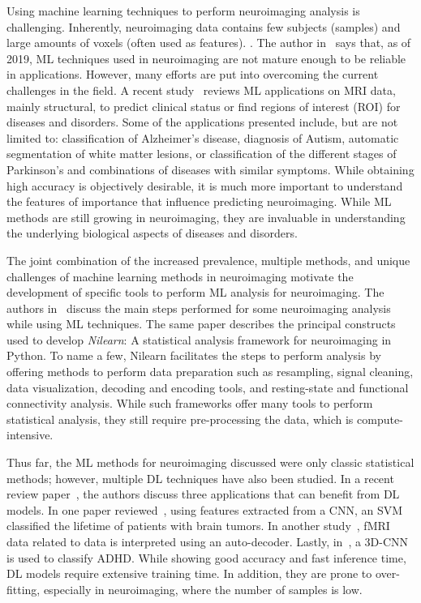 Using machine learning techniques to perform neuroimaging analysis is challenging.
Inherently, neuroimaging data contains few subjects (samples) and large amounts
of voxels (often used as features).
.
The author in~\cite{Davatzikos2019-dc} says that, as of 2019, ML techniques used in
neuroimaging are not mature enough to be reliable in applications.
However, many efforts are put into overcoming the current challenges in the field.
A recent study~\cite{Mateos-Perez2018-wx} reviews ML applications on MRI data,
mainly structural, to predict clinical status or find regions of interest (ROI) for diseases and disorders.
Some of the applications presented include, but are not limited to:
classification of Alzheimer's disease, diagnosis of Autism, automatic segmentation
of white matter lesions, or classification of the different stages of Parkinson's
and combinations of diseases with similar symptoms.
While obtaining high accuracy is objectively desirable, it is much more important
to understand the features of importance that influence predicting neuroimaging.
While ML methods are still growing in neuroimaging, they are invaluable in
understanding the underlying biological aspects of diseases and disorders. 
	
The joint combination of the increased prevalence, multiple methods, and unique
challenges of machine learning methods in neuroimaging motivate the development
of specific tools to perform ML analysis for neuroimaging.
The authors in~\cite{Abraham2014-zv} discuss the main steps performed for some
neuroimaging analysis while using ML techniques.
The same paper describes the principal constructs used to develop \textit{Nilearn}:
A statistical analysis framework for neuroimaging in Python.
To name a few, Nilearn facilitates the steps to perform analysis by offering methods
to perform data preparation such as resampling, signal cleaning, data visualization,
decoding and encoding tools, and resting-state and functional connectivity analysis.
While such frameworks offer many tools to perform statistical analysis, they still
require pre-processing the data, which is compute-intensive.
	
Thus far, the ML methods for neuroimaging discussed were only classic
statistical methods; however, multiple DL techniques have also been studied.
In a recent review paper~\cite{Wen2018-to}, the authors discuss three applications
that can benefit from DL models.
In one paper reviewed~\cite{Nie2016-sw}, using features extracted from a CNN,
an SVM classified the lifetime of patients with brain tumors.
In another study~\cite{Wen2018-xm}, fMRI data related to data is interpreted using an auto-decoder.
Lastly, in~\cite{Zou2017-hd}, a 3D-CNN is used to classify ADHD.
While showing good accuracy and fast inference time, DL models require extensive training time.
In addition, they are prone to over-fitting, especially in neuroimaging, where the number of samples is low.
	
